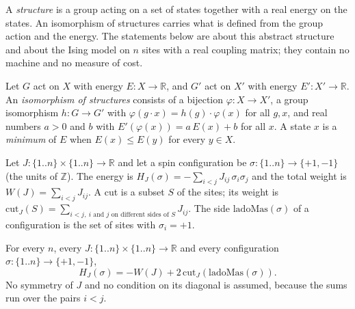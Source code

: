 A \emph{structure} is a group acting on a set of states together with a real energy on the states.
An isomorphism of structures carries what is defined from the group action and the energy.
The statements below are about this abstract structure and about the Ising model on $n$ sites with
a real coupling matrix; they contain no machine and no measure of cost.

\begin{definition}
  \label{def:physics-iso-estructura}
  \leanok
  Let $G$ act on $X$ with energy $E : X \to \mathbb{R}$, and $G'$ act on $X'$ with energy
  $E' : X' \to \mathbb{R}$. An \emph{isomorphism of structures} consists of a bijection
  $\varphi : X \to X'$, a group isomorphism $h : G \to G'$ with $\varphi(g \cdot x) = h(g) \cdot
  \varphi(x)$ for all $g, x$, and real numbers $a > 0$ and $b$ with $E'(\varphi(x)) = a\,E(x) + b$
  for all $x$. A state $x$ is a \emph{minimum} of $E$ when $E(x) \le E(y)$ for every $y \in X$.
  \own{}
\end{definition}

\begin{definition}
  \label{def:physics-ising-matrix}
  \leanok
  Let $J : \{1..n\} \times \{1..n\} \to \mathbb{R}$ and let a spin configuration be
  $\sigma : \{1..n\} \to \{+1, -1\}$ (the units of $\mathbb{Z}$). The energy is
  $H_J(\sigma) = -\sum_{i<j} J_{ij}\,\sigma_i\sigma_j$ and the total weight is
  $W(J) = \sum_{i<j} J_{ij}$. A cut is a subset $S$ of the sites; its weight is
  $\mathrm{cut}_J(S) = \sum_{i<j,\ i \text{ and } j \text{ on different sides of } S} J_{ij}$. The
  side $\mathrm{ladoMas}(\sigma)$ of a configuration is the set of sites with $\sigma_i = +1$.
  \own{}
\end{definition}

\begin{theorem}
  \label{thm:physics-ising-eq-corte}
  \leanok
  For every $n$, every $J : \{1..n\} \times \{1..n\} \to \mathbb{R}$ and every configuration
  $\sigma : \{1..n\} \to \{+1, -1\}$,
  \[
    H_J(\sigma) = -W(J) + 2\,\mathrm{cut}_J(\mathrm{ladoMas}(\sigma)).
  \]
  No symmetry of $J$ and no condition on its diagonal is assumed, because the sums run over the
  pairs $i < j$.
  \own{}
\end{theorem}

